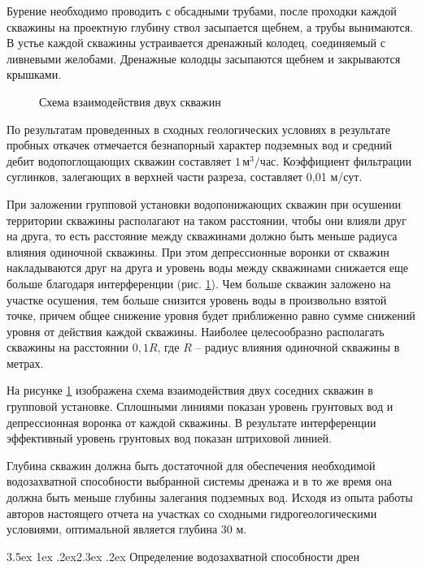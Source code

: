 \documentclass[a4paper,12pt]{article} %
\makeatletter
\renewcommand\section{\@startsection {section}{1}{\parindent}%
	{3.5ex \@plus 1ex \@minus .2ex}{2.3ex \@plus.2ex}%
	{\normalfont\hyphenpenalty=10000\Large\bfseries}}
\makeatother
\begin{document}
Бурение необходимо проводить с обсадными трубами, после проходки каждой скважины на проектную глубину ствол засыпается щебнем, а трубы вынимаются. 
В устье каждой скважины устраивается дренажный колодец, соединяемый с ливневыми желобами. Дренажные колодцы засыпаются щебнем и закрываются крышками.

\begin{figure}[!h]
	\centering
	\caption{Схема взаимодействия двух скважин}
	\label{img:scheme2}
\end{figure}

По результатам проведенных в сходных геологических условиях в результате пробных откачек отмечается безнапорный характер подземных вод и средний дебит водопоглощающих скважин составляет $1 \, м^3/час$. Коэффициент фильтрации суглинков, залегающих в верхней части разреза, составляет 0,01 м/сут. 

При заложении групповой установки водопонижающих скважин при осушении территории скважины располагают на таком расстоянии, чтобы они влияли друг на друга, то есть расстояние между скважинами должно быть меньше радиуса влияния одиночной скважины. При этом депрессионные воронки от скважин накладываются друг на друга  и уровень воды между скважинами снижается еще больше благодаря интерференции (рис. \ref{img:scheme2}). Чем больше скважин заложено на участке осушения, тем больше снизится уровень воды в произвольно взятой точке, причем общее снижение уровня будет приближенно равно сумме снижений уровня от действия каждой скважины. Наиболее целесообразно располагать скважины на расстоянии  $0,1R$, где $R$ – радиус влияния одиночной скважины в метрах. 

На рисунке \ref{img:scheme2} изображена схема взаимодействия двух соседних скважин в групповой установке. Сплошными линиями показан уровень грунтовых вод и депрессионная воронка от каждой скважины. В результате интерференции эффективный уровень грунтовых вод показан штриховой линией. 

Глубина скважин должна быть достаточной для обеспечения необходимой водозахватной способности выбранной системы дренажа и в то же время она должна быть меньше глубины залегания подземных вод. Исходя из опыта работы авторов настоящего отчета на участках со сходными гидрогеологическими условиями, оптимальной является глубина 30 м.


\section{Определение водозахватной способности дрен}
\end{document}
